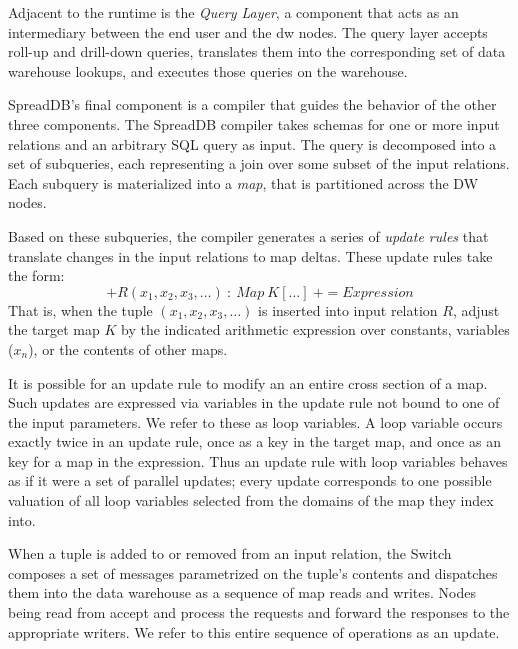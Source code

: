 \documentclass{sig-alternate}
\begin{document}
Adjacent to the runtime is the \textit{Query Layer}, a component that acts as an intermediary between the end user and the dw nodes.  The query layer accepts roll-up and drill-down queries, translates them into the corresponding set of data warehouse lookups, and executes those queries on the warehouse.

SpreadDB's final component is a compiler that guides the behavior of the other three components.  The SpreadDB compiler takes schemas for one or more input relations and an arbitrary SQL query as input.  The query is decomposed into a set of subqueries, each representing a join over some subset of the input relations.  Each subquery is materialized into a \textit{map}, that is partitioned across the DW nodes.  

Based on these subqueries, the compiler generates a series of \textit{update rules} that translate changes in the input relations to map deltas.  These update rules take the form:
$$+R(x_1, x_2, x_3, \ldots)\ :\ Map\ K[\ldots]\ += Expression$$
That is, when the tuple $(x_1, x_2, x_3, \ldots)$ is inserted into input relation $R$, adjust the target map $K$ by the indicated arithmetic expression over constants, variables ($x_n$), or the contents of other maps.  
 
It is possible for an update rule to modify an an entire cross section of a map.  Such updates are expressed via variables in the update rule not bound to one of the input parameters.  We refer to these as loop variables.  A loop variable occurs exactly twice in an update rule, once as a key in the target map, and once as an key for a map in the expression.  Thus an update rule with loop variables behaves as if it were a set of parallel updates; every update corresponds to one possible valuation of all loop variables selected from the domains of the map they index into.

When a tuple is added to or removed from an input relation, the Switch composes a set of messages parametrized on the tuple's contents and dispatches them into the data warehouse as a sequence of map reads and writes.  Nodes being read from accept and process the requests and forward the responses to the appropriate writers.  We refer to this entire sequence of operations as an update.
\end{document}
